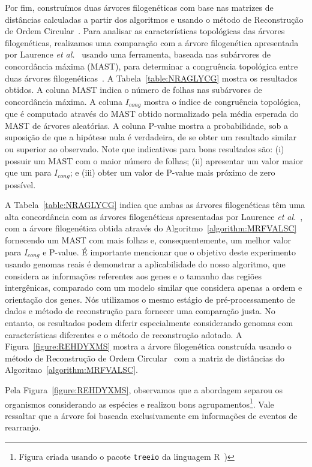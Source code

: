 Por fim, construímos duas árvores filogenéticas com base nas matrizes de distâncias calculadas a partir dos algoritmos e usando o método de Reconstrução de Ordem Circular~\cite{makarenkov1997tree}. Para analisar as características topológicas das árvores filogenéticas, realizamos uma comparação com a árvore filogenética apresentada por Laurence \textit{et al.}~\cite{cyanorak} usando uma ferramenta, baseada nas subárvores de concordância máxima (MAST), para determinar a congruência topológica entre duas árvores filogenéticas~\cite{de2007congruence}. A Tabela~\ref{table:NRAGLYCG} mostra os resultados obtidos. A coluna MAST indica o número de folhas nas subárvores de concordância máxima. A coluna $I_{cong}$ mostra o índice de congruência topológica, que é computado através do MAST obtido normalizado pela média esperada do MAST de árvores aleatórias. A coluna P-value mostra a probabilidade, sob a suposição de que a hipótese nula é verdadeira, de se obter um resultado similar ou superior ao observado. Note que indicativos para bons resultados são: (i) possuir um MAST com o maior número de folhas; (ii) apresentar um valor maior que um para $I_{cong}$; e (iii) obter um valor de P-value mais próximo de zero possível.



A Tabela~\ref{table:NRAGLYCG} indica que ambas as árvores filogenéticas têm uma alta concordância com as árvores filogenéticas apresentadas por Laurence \textit{et al.}~\cite{cyanorak}, com a árvore filogenética obtida através do Algoritmo~\ref{algorithm:MRFVALSC} fornecendo um MAST com mais folhas e, consequentemente, um melhor valor para $I_{cong}$ e P-value. É importante mencionar que o objetivo deste experimento usando genomas reais é demonstrar a aplicabilidade do nosso algoritmo, que considera as informações referentes aos genes e o tamanho das regiões intergênicas, comparado com um modelo similar que considera apenas a ordem e orientação dos genes. Nós utilizamos o mesmo estágio de pré-processamento de dados e método de reconstrução para fornecer uma comparação justa. No entanto, os resultados podem diferir especialmente considerando genomas com características diferentes e o método de reconstrução adotado. A Figura~\ref{figure:REHDYXMS} mostra a árvore filogenética construída usando o método de Reconstrução de Ordem Circular~\cite{makarenkov1997tree} com a matriz de distâncias do Algoritmo~\ref{algorithm:MRFVALSC}.



Pela Figura~\ref{figure:REHDYXMS}, observamos que a abordagem separou os organismos considerando as espécies e realizou bons agrupamentos\footnote{Figura criada usando o pacote \texttt{treeio} da linguagem R~\cite{wang2020treeio})}. Vale ressaltar que a árvore foi baseada exclusivamente em informações de eventos de rearranjo.

